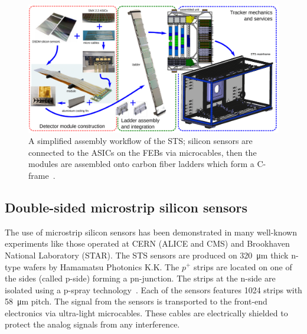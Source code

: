 \newpage
\begin{figure}[!h]
\centering
\includegraphics[width=1\columnwidth]{Chapter2/images/assembly_sequence.png}
\caption{A simplified assembly workflow of the \gls{STS}; silicon sensors are connected to the ASICs on the \glspl{FEB} via microcables, then the modules are assembled onto carbon fiber ladders which form a C-frame~\cite{Teklishyn}.}
\label{fig_assembly}
\end{figure}






\subsection{Double-sided microstrip silicon sensors}
\label{sensors}

The use of microstrip silicon sensors has been demonstrated in many well-known experiments like those operated at \gls{CERN} (\gls{ALICE} and \gls{CMS}) and Brookhaven National Laboratory (\gls{STAR}). The \gls{STS} sensors are produced on \SI{320}{\micro\metre} thick n-type wafers by Hamamatsu Photonics K.K. The $p^{+}$ strips are located on one of the sides (called p-side) forming a pn-junction. The strips at the n-side are isolated using a p-spray technology~\cite{Heuser:54798}. Each of the sensors features 1024 strips with \SI{58}{\micro\metre} pitch. The signal from the sensors is transported to the front-end electronics via ultra-light microcables. These cables are electrically shielded to protect the analog signals from any interference. 

